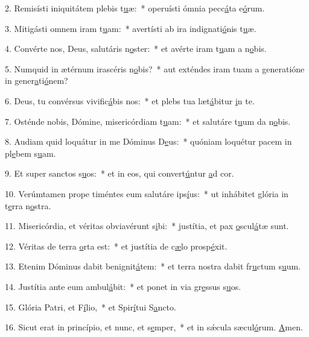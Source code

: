 2. Remisísti iniquitátem plebis t\uline{u}æ:~* operuísti ómnia pecc\uline{á}ta e\uline{ó}rum.\par 
3. Mitigásti omnem iram t\uline{u}am:~* avertísti ab ira indignati\uline{ó}nis t\uline{u}æ.\par 
4. Convérte nos, Deus, salutáris n\uline{o}ster:~* et avérte iram t\uline{u}am a n\uline{o}bis.\par 
5. Numquid in ætérnum irascéris n\uline{o}bis?~* aut exténdes iram tuam a generatióne in gener\uline{a}ti\uline{ó}nem?\par 
6. Deus, tu convérsus vivific\uline{á}bis nos:~* et plebs tua læt\uline{á}bitur \uline{i}n te.\par 
7. Osténde nobis, Dómine, misericórdiam t\uline{u}am:~* et salutáre t\uline{u}um da n\uline{o}bis.\par 
8. Audiam quid loquátur in me Dóminus D\uline{e}us:~* quóniam loquétur pacem in pl\uline{e}bem s\uline{u}am.\par 
9. Et super sanctos s\uline{u}os:~* et in eos, qui convert\uline{ú}ntur \uline{a}d cor.\par 
10. Verúmtamen prope timéntes eum salutáre ips\uline{í}us:~* ut inhábitet glória in t\uline{e}rra n\uline{o}stra.\par 
11. Misericórdia, et véritas obviavérunt s\uline{i}bi:~* justítia, et pax \uline{o}scul\uline{á}tæ sunt.\par 
12. Véritas de terra \uline{o}rta est:~* et justítia de c\uline{æ}lo prosp\uline{é}xit.\par 
13. Etenim Dóminus dabit benignit\uline{á}tem:~* et terra nostra dabit fr\uline{u}ctum s\uline{u}um.\par 
14. Justítia ante eum ambul\uline{á}bit:~* et ponet in via gr\uline{e}ssus s\uline{u}os.\par 
15. Glória Patri, et F\uline{í}lio,~* et Spir\uline{í}tui S\uline{a}ncto.\par 
16. Sicut erat in princípio, et nunc, et s\uline{e}mper,~* et in sǽcula sæcul\uline{ó}rum. \uline{A}men.\par 
